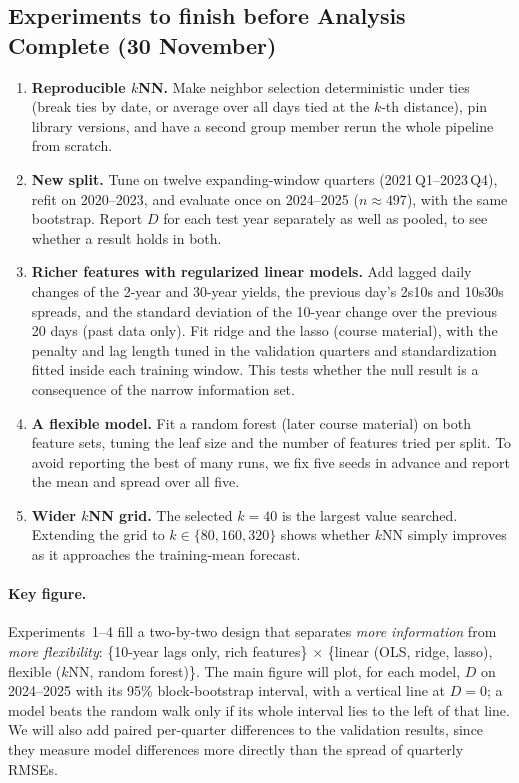 \documentclass{article}
\begin{document}
\subsection{Experiments to finish before Analysis Complete (30 November)}
\begin{enumerate}[leftmargin=*,label=\textbf{Exp.~\arabic*:},start=0,itemsep=3pt]
  \item \textbf{Reproducible $k$NN.} Make neighbor selection deterministic under ties (break ties by date, or average over all days tied at the $k$-th distance), pin library versions, and have a second group member rerun the whole pipeline from scratch.
  \item \textbf{New split.} Tune on twelve expanding-window quarters (2021\,Q1--2023\,Q4), refit on 2020--2023, and evaluate once on 2024--2025 ($n \approx 497$), with the same bootstrap. Report $D$ for each test year separately as well as pooled, to see whether a result holds in both.
  \item \textbf{Richer features with regularized linear models.} Add lagged daily changes of the 2-year and 30-year yields, the previous day's 2s10s and 10s30s spreads, and the standard deviation of the 10-year change over the previous 20 days (past data only). Fit ridge and the lasso (course material), with the penalty and lag length tuned in the validation quarters and standardization fitted inside each training window. This tests whether the null result is a consequence of the narrow information set.
  \item \textbf{A flexible model.} Fit a random forest (later course material) on both feature sets, tuning the leaf size and the number of features tried per split. To avoid reporting the best of many runs, we fix five seeds in advance and report the mean and spread over all five.
  \item \textbf{Wider $k$NN grid.} The selected $k=40$ is the largest value searched. Extending the grid to $k \in \{80, 160, 320\}$ shows whether $k$NN simply improves as it approaches the training-mean forecast.
\end{enumerate}

\paragraph{Key figure.} Experiments~1--4 fill a two-by-two design that separates \emph{more information} from \emph{more flexibility}: \{10-year lags only, rich features\} $\times$ \{linear (OLS, ridge, lasso), flexible ($k$NN, random forest)\}. The main figure will plot, for each model, $D$ on 2024--2025 with its 95\% block-bootstrap interval, with a vertical line at $D=0$; a model beats the random walk only if its whole interval lies to the left of that line. We will also add paired per-quarter differences to the validation results, since they measure model differences more directly than the spread of quarterly RMSEs.
\end{document}
